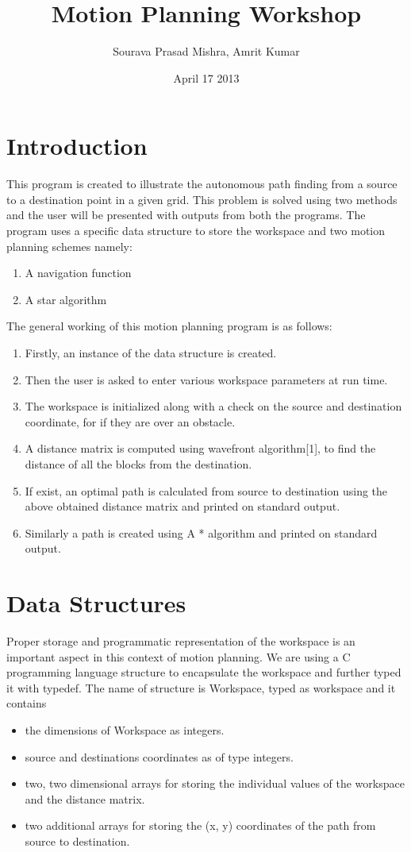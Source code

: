 \documentclass{report}
\title{Motion Planning Workshop}
\author{Sourava Prasad Mishra, Amrit Kumar}
\date{April 17 2013}
\begin{document}
\maketitle

\section{Introduction}

	This program is created to illustrate the autonomous path finding from a source to a destination point in a given grid. This problem is solved using two methods and the user will be presented with outputs from both the programs. The program uses a specific data structure to store the workspace and two motion planning schemes namely:
	\begin{enumerate}
	\item A navigation function
	\item A star algorithm
	\end{enumerate}

	The general working of this motion planning program is as follows:
	\begin{enumerate}
	\item Firstly, an instance of the data structure is created.
	\item Then the user is asked to enter various workspace parameters at run time.
	\item The workspace is initialized along with a check on the source and destination coordinate, for if they are over an obstacle.
	\item A distance matrix is computed using \textsf{wavefront algorithm}[1], to find the distance of all the blocks from the destination.
	\item If exist, an optimal path is calculated from source to destination using the above obtained distance matrix and printed on standard output.
	\item Similarly a path is created using A * algorithm and printed on standard output.
	\end{enumerate}

\section{Data Structures}
	Proper storage and programmatic representation of the workspace is an important aspect in this context of motion planning. We are using a \textsf{C} programming language \textsf{structure} to encapsulate the workspace and further typed it with \textsf{typedef}. The name of structure is \textsf{Workspace}, typed as \textsf{workspace} and it contains	
	\begin{itemize}
	\item the dimensions of Workspace as \textsf{integers}.
	\item source and destinations coordinates as of type \textsf{integers}.
	\item two, two dimensional \textsf{arrays} for storing the individual values of the workspace and the distance matrix.
	\item two additional \textsf{arrays} for storing the (x, y) coordinates of the path from source to destination.
	\end{itemize}
	
\end{document}
